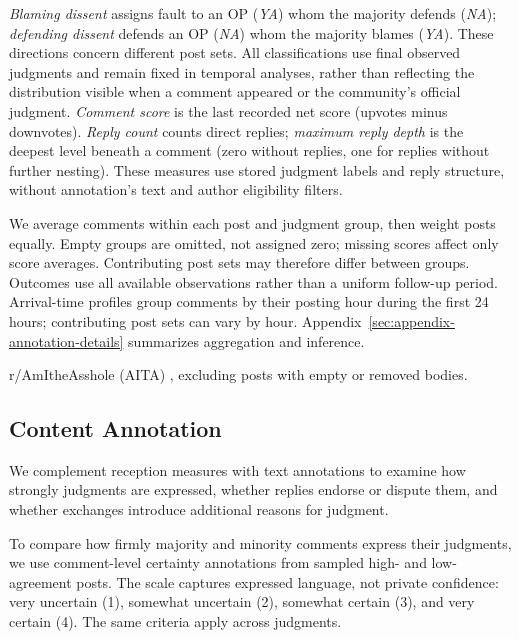 \emph{Blaming dissent} assigns fault to an OP (\emph{YA}) whom the majority defends (\emph{NA});
\emph{defending dissent} defends an OP (\emph{NA}) whom the majority blames (\emph{YA}).
These directions concern different post sets. All classifications use
final observed judgments and remain fixed in temporal analyses, rather
than reflecting the distribution visible when a comment appeared or
the community's official judgment.
\emph{Comment score} is the last recorded net score (upvotes minus downvotes).
\emph{Reply count} counts direct replies; \emph{maximum reply depth}
is the deepest level beneath a comment (zero without replies,
one for replies without further nesting). These measures use stored judgment labels
and reply structure, without annotation's text and author eligibility filters.

We average comments within each post and judgment group, then weight
posts equally. Empty groups are omitted, not assigned zero; missing
scores affect only score averages. Contributing post sets may therefore
differ between groups. Outcomes use all available observations rather
than a uniform follow-up period. Arrival-time profiles group comments by
their posting hour during the first 24 hours; contributing post sets can
vary by hour. Appendix~\ref{sec:appendix-annotation-details} summarizes
aggregation and inference.

 r/AmItheAsshole (AITA) , 
excluding posts with empty or removed bodies.


\subsection{Content Annotation}
\label{subsec:method-annotation}

We complement reception measures with text annotations to examine how
strongly judgments are expressed, whether replies endorse or dispute
them, and whether exchanges introduce additional reasons for judgment.

To compare how firmly majority and minority comments express their judgments,
we use comment-level certainty annotations from sampled high- and
low-agreement posts. The scale captures
expressed language, not private confidence: very uncertain (1), somewhat
uncertain (2), somewhat certain (3), and very certain (4). The same
criteria apply across judgments.

